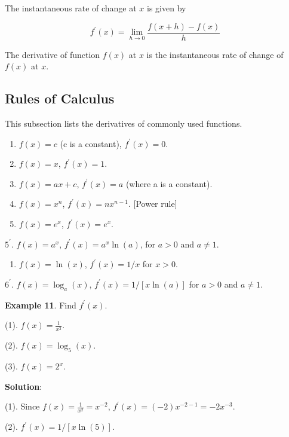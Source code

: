 \documentclass[
]{book}
\providecommand{\tightlist}{%
  \setlength{\itemsep}{0pt}\setlength{\parskip}{0pt}}
\begin{document}
The instantaneous rate of change at \(x\) is given by

\[
f^\prime (x) = \lim_{h\to 0} \frac{f(x+h)-f(x)}{h}
\]

The derivative of function \(f(x)\) at \(x\) is the instantaneous rate of change of \(f(x)\) at \(x\).

\hypertarget{rules-of-calculus}{%
\subsection{Rules of Calculus}\label{rules-of-calculus}}

This subsection lists the derivatives of commonly used functions.

\begin{enumerate}
\def\labelenumi{\arabic{enumi}.}
\item
  \(f(x) = c\) (c is a constant), \(f^\prime(x) = 0\).
\item
  \(f(x) = x\), \(f^\prime (x) = 1.\)
\item
  \(f(x) = ax + c\), \(f^\prime(x) = a\) (where a is a constant).
\item
  \(f(x) = x^n\), \(f^\prime(x) = nx^{n-1}\). {[}Power rule{]}
\item
  \(f(x) = e^x\), \(f^\prime (x) = e^x\).
\end{enumerate}

\(5^\prime\). \(f(x) = a^x\), \(f^\prime (x) = a^x \ln(a)\), for \(a > 0\) and \(a \ne 1\).

\begin{enumerate}
\def\labelenumi{\arabic{enumi}.}
\setcounter{enumi}{5}
\tightlist
\item
  \(f(x) = \ln (x)\), \(f^\prime (x) = 1/x\) for \(x > 0\).
\end{enumerate}

\(6^\prime\). \(f(x) = \log_a(x)\), \(f^\prime(x) = 1/[x\ln(a)]\) for \(a > 0\) and \(a \ne 1\).

\hfill\break

\textbf{Example 11}. Find \(f^\prime(x)\).

(1). \(f(x) = \frac{1}{x^2}\).

(2). \(f(x) = \log_5(x)\).

(3). \(f(x) = 2^x\).

\textbf{Solution}:

(1). Since \(f(x) = \frac{1}{x^2} = x^{-2}\), \(f^\prime (x) = (-2)x^{-2-1} = -2x^{-3}.\)

(2). \(f^\prime (x) = 1/[x\ln(5)]\).
\end{document}
